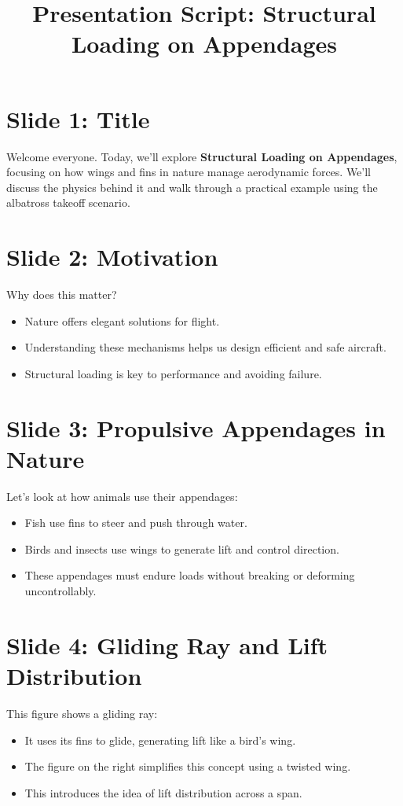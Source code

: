 \documentclass[12pt]{article}
\title{Presentation Script: Structural Loading on Appendages}
\date{}
\begin{document}
\maketitle

\section*{Slide 1: Title}
Welcome everyone. Today, we'll explore \textbf{Structural Loading on Appendages}, focusing on how wings and fins in nature manage aerodynamic forces. We'll discuss the physics behind it and walk through a practical example using the albatross takeoff scenario.

\section*{Slide 2: Motivation}
Why does this matter?
\begin{itemize}
    \item Nature offers elegant solutions for flight.
    \item Understanding these mechanisms helps us design efficient and safe aircraft.
    \item Structural loading is key to performance and avoiding failure.
\end{itemize}

\section*{Slide 3: Propulsive Appendages in Nature}
Let’s look at how animals use their appendages:
\begin{itemize}
    \item Fish use fins to steer and push through water.
    \item Birds and insects use wings to generate lift and control direction.
    \item These appendages must endure loads without breaking or deforming uncontrollably.
\end{itemize}

\section*{Slide 4: Gliding Ray and Lift Distribution}
This figure shows a gliding ray:
\begin{itemize}
    \item It uses its fins to glide, generating lift like a bird's wing.
    \item The figure on the right simplifies this concept using a twisted wing.
    \item This introduces the idea of lift distribution across a span.
\end{itemize}
\end{document}
